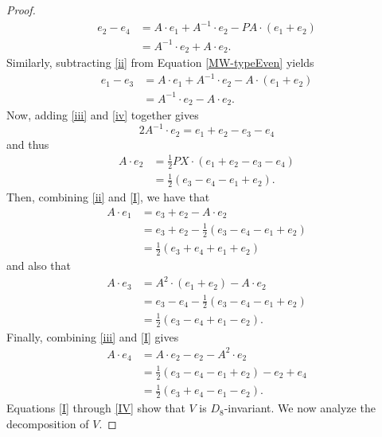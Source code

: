 \documentclass[a4paper,reqno]{amsart}
\theoremstyle{definition}
\theoremstyle{remark} \newtheorem{remark}[theorem]{Remark}
\numberwithin{equation}{section}
\begin{document}
\begin{proof}
    \begin{align*} \label{iii}
        e_2 - e_4 &= A\cdot e_1 + A^{-1} \cdot e_2 - PA \cdot (e_1 + e_2) \nonumber \\
        &= A^{-1} \cdot e_2 + A \cdot e_2 \tag{iii}.
    \end{align*}
    Similarly, subtracting \eqref{ii} from Equation \ref{MW-typeEven} yields
    \begin{align} \label{iv}
        e_1 - e_3 &= A \cdot e_1 + A^{-1} \cdot e_2 - A \cdot (e_1 + e_2) \nonumber \\
        &= A^{-1}\cdot e_2 - A \cdot e_2 \tag{iv}. 
    \end{align}
    Now, adding \eqref{iii} and \eqref{iv} together gives
    \begin{equation*}
        2A^{-1} \cdot e_2 = e_1 + e_2 - e_3 - e_4 
    \end{equation*}
    and thus
    \begin{align} \label{I}
        A \cdot e_2 &= \frac{1}{2}PX \cdot (e_1 + e_2 - e_3 - e_4) \nonumber \\
        &= \frac{1}{2}(e_3 - e_4 - e_1 + e_2). \tag{I}
    \end{align}
    Then, combining \eqref{ii} and \eqref{I}, we have that
    \begin{align} \label{II}
        A \cdot e_1 &= e_3 + e_2 - A\cdot e_2 \nonumber \\
        &= e_3 + e_2 - \frac{1}{2}(e_3 - e_4 - e_1 + e_2) \nonumber \\
        &= \frac{1}{2}(e_3 + e_4 + e_1 + e_2) \tag{II}
    \end{align}
    and also that
    \begin{align} \label{III}
        A \cdot e_3 &= A^2 \cdot (e_1 + e_2) - A \cdot e_2 \nonumber \\
        &= e_3 - e_4 - \frac{1}{2}(e_3 - e_4 - e_1 + e_2) \nonumber \\
        &= \frac{1}{2}(e_3 - e_4 + e_1 - e_2). \tag{III}
    \end{align}
    Finally, combining \eqref{iii} and \eqref{I} gives
    \begin{align} \label{IV}
        A \cdot e_4 &= A \cdot e_2 - e_2 - A^2 \cdot e_2 \nonumber \\
        &= \frac{1}{2}(e_3 - e_4 - e_1 + e_2) - e_2 + e_4 \nonumber \\
        &= \frac{1}{2}(e_3 + e_4 - e_1 - e_2). \tag{IV}
    \end{align}
    Equations \eqref{I} through \eqref{IV} show that \(V\) is \(D_8\)-invariant. We now analyze the decomposition of \(V\).


\end{proof}
\end{document}

